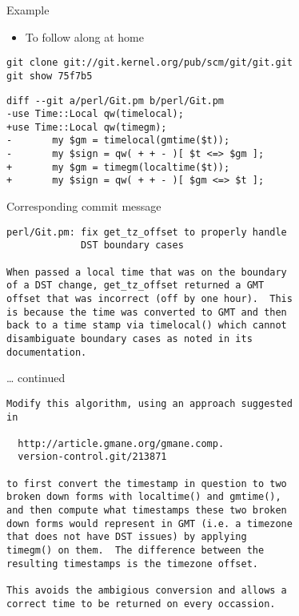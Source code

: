 \documentclass[presentation]{beamer}
\begin{document}
\begin{frame}[fragile,label=sec-1-12]{Example}
 \begin{itemize}
\item To follow along at home
\end{itemize}
\begin{verbatim}
git clone git://git.kernel.org/pub/scm/git/git.git
git show 75f7b5
\end{verbatim}
\begin{verbatim}
diff --git a/perl/Git.pm b/perl/Git.pm
-use Time::Local qw(timelocal);
+use Time::Local qw(timegm);
-       my $gm = timelocal(gmtime($t));
-       my $sign = qw( + + - )[ $t <=> $gm ];
+       my $gm = timegm(localtime($t));
+       my $sign = qw( + + - )[ $gm <=> $t ];
\end{verbatim}
\end{frame}
\begin{frame}[fragile,label=sec-1-13]{Corresponding commit message}
 \begin{verbatim}
perl/Git.pm: fix get_tz_offset to properly handle
             DST boundary cases

When passed a local time that was on the boundary
of a DST change, get_tz_offset returned a GMT
offset that was incorrect (off by one hour).  This
is because the time was converted to GMT and then
back to a time stamp via timelocal() which cannot
disambiguate boundary cases as noted in its
documentation.
\end{verbatim}
\end{frame}
\begin{frame}[fragile,label=sec-1-14]{\ldots{} continued}
 \begin{verbatim}
Modify this algorithm, using an approach suggested
in

  http://article.gmane.org/gmane.comp.
  version-control.git/213871

to first convert the timestamp in question to two
broken down forms with localtime() and gmtime(),
and then compute what timestamps these two broken
down forms would represent in GMT (i.e. a timezone
that does not have DST issues) by applying
timegm() on them.  The difference between the
resulting timestamps is the timezone offset.

This avoids the ambigious conversion and allows a
correct time to be returned on every occassion.
\end{verbatim}
\end{frame}
\end{document}
